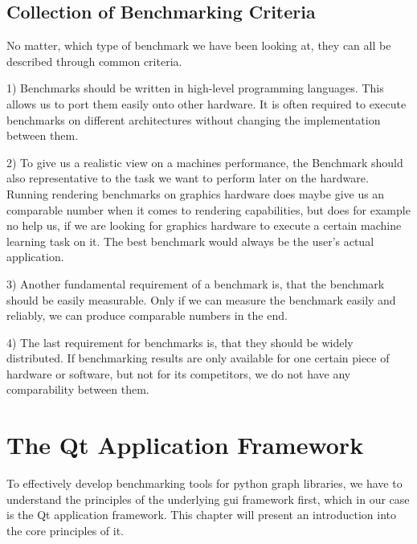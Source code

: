 
\subsection{Collection of Benchmarking Criteria}

No matter, which type of benchmark we have been looking at, they can all be
described through common criteria.

1) Benchmarks should be written in high-level programming languages. This allows
us to port them easily onto other hardware. It is often required to execute
benchmarks on different architectures without changing the implementation
between them.

2) To give us a realistic view on a machines performance, the Benchmark should
also representative to the task we want to perform later on the hardware.
Running rendering benchmarks on graphics hardware does maybe give us an
comparable number when it comes to rendering capabilities, but does for example
no help us, if we are looking for graphics hardware to execute a certain machine
learning task on it. The best benchmark would always be the user's actual
application.

3) Another fundamental requirement of a benchmark is, that the benchmark should
be easily measurable. Only if we can measure the benchmark easily and reliably,
we can produce comparable numbers in the end. 

4) The last requirement for benchmarks is, that they should be widely
distributed. If benchmarking results are only available for one certain piece of
hardware or software, but not for its competitors, we do not have any
comparability between them.



\section{The Qt Application Framework}
\label{sec:fundamentals:qt}

To effectively develop benchmarking tools for python graph libraries, we have to
understand the principles of the underlying \gls{gui} framework first, which in
our case is the Qt application framework. This chapter will present an
introduction into the core principles of it.


